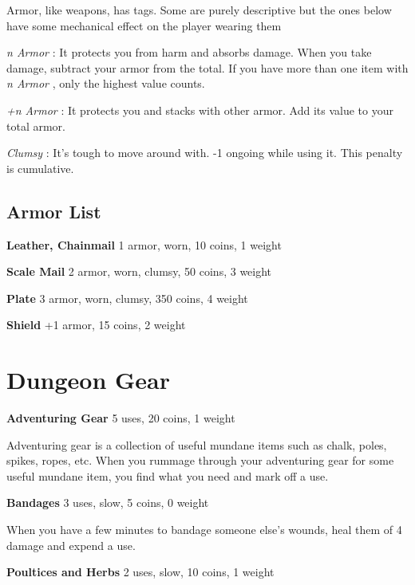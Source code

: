Armor, like weapons, has tags. Some are purely descriptive but the ones below have some mechanical effect on the player wearing them

\emph{n Armor}
: It protects you from harm and absorbs damage. When you take damage, subtract your armor from the total. If you have more than one item with \emph{n Armor}
, only the highest value counts. 

\emph{+n Armor}
: It protects you and stacks with other armor. Add its value to your total armor.

\emph{Clumsy}
: It's tough to move around with. -1 ongoing while using it. This penalty is cumulative.
\subsection{Armor List}

{\noindent \bfseries Leather, Chainmail} \hspace*{\fill} 1 armor, worn, 10 coins, 1 weight

{\noindent \bfseries Scale Mail} \hspace*{\fill} 2 armor, worn, clumsy, 50 coins, 3 weight

{\noindent \bfseries Plate} \hspace*{\fill} 3 armor, worn, clumsy, 350 coins, 4 weight

{\noindent \bfseries Shield} \hspace*{\fill} +1 armor, 15 coins, 2 weight
\section*{Dungeon Gear}

{\noindent \bfseries Adventuring Gear} \hspace*{\fill} 5 uses, 20 coins, 1 weight

Adventuring gear is a collection of useful mundane items such as chalk, poles, spikes, ropes, etc. When you rummage through your adventuring gear for some useful mundane item, you find what you need and mark off a use.

{\noindent \bfseries Bandages} \hspace*{\fill} 3 uses, slow, 5 coins, 0 weight

When you have a few minutes to bandage someone else's wounds, heal them of 4 damage and expend a use.

{\noindent \bfseries Poultices and Herbs} \hspace*{\fill} 2 uses, slow, 10 coins, 1 weight

